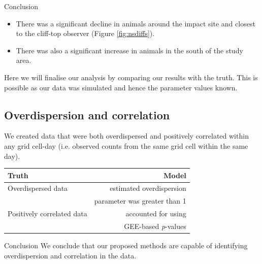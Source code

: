 \begin{block}{Conclusion}
 \begin{itemize}
  \item There was a significant decline in animals around the impact site and closest to the cliff-top observer (Figure \ref{fig:nsdiffs}).
  \item There was also a significant increase in animals in the south of the study area.
\end{itemize}
\end{block}

Here we will finalise our analysis by comparing our results with the truth. This is possible as our data was simulated and hence the parameter values known. 
\subsection{Overdispersion and correlation}
We created data that were both overdispersed and positively correlated within any grid cell-day (i.e. observed counts from the same grid cell within the same day). 
\begin{table}[h!]
\begin{tabular}{l|r}
\textbf{Truth} & \textbf{Model}\\
\hline
Overdispersed  data & estimated overdispersion \\
 & parameter was greater than 1\\
\hline
Positively correlated data & accounted for using\\
 & GEE-based \textit{p}-values\\
\end{tabular}\end{table}
\begin{block}{Conclusion}
We conclude that our proposed methods are capable of identifying overdispersion and correlation in the data.
\end{block}

